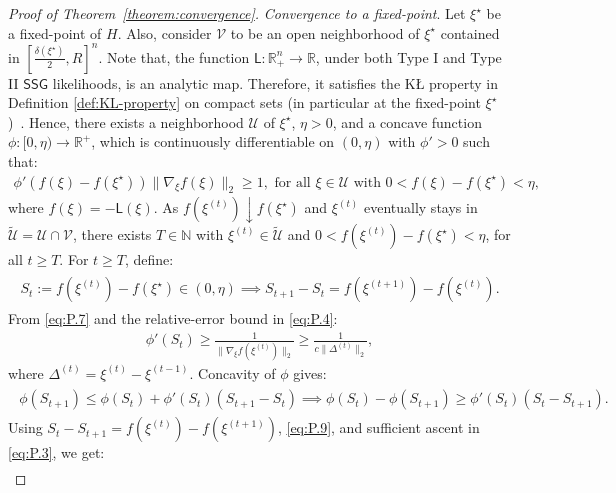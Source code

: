 \documentclass[12pt]{article}
\numberwithin{equation}{section}
\begin{document}
\begin{proof}[Proof of Theorem~\ref{theorem:convergence}]
\noindent
\emph{Convergence to a fixed-point}. Let $\xi^{\star}$ be a fixed-point of $H$. Also, consider $\mathcal{V}$ to be an open neighborhood of $\xi^{\star}$ contained in $\left[\tfrac{\delta(\xi^{\star})}{2}, R\right]^{n}$.
Note that, the function $\mathsf{L}:\mathbb{R}_{+}^{n}\to \mathbb{R}$, under both Type I and Type II $\mathsf{SSG}$ likelihoods, is an analytic map. Therefore, it satisfies the K\L{} property in Definition \ref{def:KL-property} on compact sets (in particular at the fixed-point $\xi^{\star}$)~\citep{KL-SIAM-1,bolte2014proximal}. Hence, there exists a neighborhood $\mathcal{U}$ of $\xi^{\star}$, $\eta>0$, and a concave function $\phi: [0, \eta) \to \mathbb{R}^{+}$, which is continuously differentiable on $(0, \eta)$ with $\phi'> 0$ such that:
\begin{align}\label{eq:P.7}
\phi'(f(\xi) - f(\xi^{\star}))\lVert \nabla_\xi f(\xi)\rVert_2 \geq 1,\text{ for all }\xi\in \mathcal{U}\text{ with }0<f(\xi) - f(\xi^{\star})< \eta, 
\end{align}
where $f(\xi) = -\mathsf{L}(\xi)$. As $f(\xi^{(t)}) \downarrow f(\xi^{\star})$ and $\xi^{(t)}$ eventually stays in $\tilde{\mathcal{U}} = \mathcal{U} \cap \mathcal{V}$, there exists $T\in \mathbb{N}$ with $\xi^{(t)} \in \tilde{\mathcal{U}}$ and $0<f(\xi^{(t)}) - f(\xi^{\star}) <\eta$, for all $t\geq T$. For $t\geq T$, define:
\begin{align}\label{eq:P.8}
\begin{split}
    S_t:= f(\xi^{(t)}) - f(\xi^{\star}) \in (0, \eta)
    \implies S_{t+1} - S_{t} = f(\xi^{(t+1)}) - f(\xi^{(t)}). 
\end{split}
\end{align}
From \eqref{eq:P.7} and the relative-error bound in \eqref{eq:P.4}:
\begin{align}\label{eq:P.9}
    \phi'(S_t) \geq \frac{1}{\lVert \nabla_{\xi} f(\xi^{(t)})\rVert_2} \geq \frac{1}{c\lVert \Delta^{(t)}\rVert_2},
\end{align}
where $\Delta^{(t)} = \xi^{(t)} - \xi^{(t-1)}$. Concavity of $\phi$ gives:
\begin{align}\label{eq:P.10}
    \begin{split}
        \phi(S_{t+1}) \leq \phi(S_t) + \phi'(S_t)(S_{t+1} - S_t)
        \implies \phi(S_t) - \phi(S_{t+1}) \geq \phi'(S_t)(S_t-S_{t+1}).
    \end{split}
\end{align}
Using $S_t - S_{t+1} = f(\xi^{(t)}) - f(\xi^{(t+1)})$, \eqref{eq:P.9}, and sufficient ascent in \eqref{eq:P.3}, we get:
\begin{align}\label{eq:P.11}

\end{align}
\end{proof}
\end{document}
